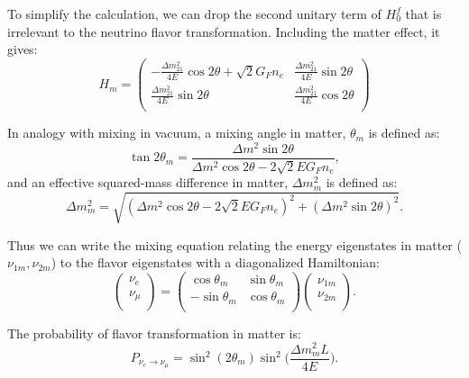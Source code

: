 To simplify the calculation, we can drop the second unitary term of $H^f_0$ that is irrelevant to the neutrino flavor transformation. Including the matter effect, it gives:
\begin{equation}\label{eq:Hm}
	H_m = \begin{pmatrix}
		-\frac{\Delta m_{21}^2}{4E}\cos 2\theta+\sqrt 2G_Fn_e & \frac{\Delta m_{21}^2}{4E}\sin 2\theta\\
		\frac{\Delta m_{21}^2}{4E}\sin 2\theta &\frac{\Delta m_{21}^2}{4E}\cos 2\theta\\
	\end{pmatrix}
\end{equation}

In analogy with mixing in vacuum, a mixing angle in matter, $\theta_m$ is defined as:
\begin{equation}\label{eq:thetaM}
	\tan 2\theta_m = \frac{\Delta m^2\sin2\theta}{\Delta m^2\cos2\theta-2\sqrt 2E G_Fn_e},
\end{equation}
and an effective squared-mass difference in matter, $\Delta m^2_m$ is defined as:
\begin{equation}
	\Delta m^2_m = \sqrt{(\Delta m^2\cos2\theta - 2\sqrt 2EG_Fn_e)^2+(\Delta m^2\sin2\theta)^2}.
\end{equation}

Thus we can write the mixing equation relating the energy eigenstates in matter ($\nu_{1m},\nu_{2m}$) to the flavor eigenstates with a diagonalized Hamiltonian:
\begin{equation}\label{eq:matter_mixing}
	\begin{pmatrix}
		\nu_e\\
		\nu_\mu\\
	\end{pmatrix}
	= \begin{pmatrix}
		\cos\theta_m & \sin\theta_m\\
		-\sin\theta_m & \cos\theta_m \\
	\end{pmatrix}
	\begin{pmatrix}
		\nu_{1m}\\
		\nu_{2m}\\
	\end{pmatrix}.
\end{equation}

The probability of flavor transformation in matter is:
\begin{equation}
	P_{\nu_e\to\nu_{\mu}}=\sin^2(2\theta_m)\sin^2\Big(\frac{\Delta m_m^2L}{4E}\Big).
\end{equation}

